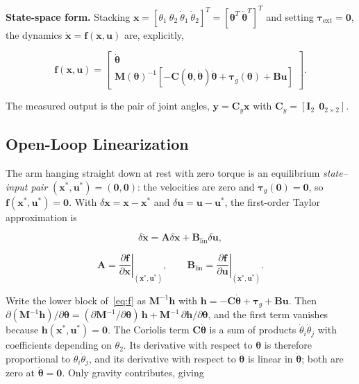 \documentclass[letterpaper, 10pt, conference]{ieeeconf}
\begin{document}
\textbf{State-space form.}
Stacking $\mathbf{x}=[\theta_1\ \theta_2\ \dot{\theta}_1\
\dot{\theta}_2]^{T}=[\boldsymbol{\theta}^T\
\dot{\boldsymbol{\theta}}^T]^T$ and setting
$\boldsymbol{\tau}_{\mathrm{ext}}=\mathbf{0}$, the
dynamics $\dot{\mathbf{x}}=\mathbf{f}(\mathbf{x},\mathbf{u})$
are, explicitly,

\begin{equation}
\mathbf{f}(\mathbf{x},\mathbf{u})=
\begin{bmatrix}
\dot{\boldsymbol{\theta}}\\[2pt]
\mathbf{M}(\boldsymbol{\theta})^{-1}
\left[-\mathbf{C}(\boldsymbol{\theta},\dot{\boldsymbol{\theta}})
\dot{\boldsymbol{\theta}}
+\boldsymbol{\tau}_g(\boldsymbol{\theta})
+\mathbf{B}\mathbf{u}\right]
\end{bmatrix}.
\label{eq:f}
\end{equation}

The measured output is the pair of joint angles,
$\mathbf{y}=\mathbf{C}_y\mathbf{x}$ with
$\mathbf{C}_y=[\mathbf{I}_2\ \ \mathbf{0}_{2\times2}]$.

\subsection{Open-Loop Linearization}

The arm hanging straight down at rest with zero torque
is an equilibrium \emph{state--input pair}
$(\mathbf{x}^*,\mathbf{u}^*)=(\mathbf{0},\mathbf{0})$:
the velocities are zero and
$\boldsymbol{\tau}_g(\mathbf{0})=\mathbf{0}$, so
$\mathbf{f}(\mathbf{x}^*,\mathbf{u}^*)=\mathbf{0}$.
With $\delta\mathbf{x}=\mathbf{x}-\mathbf{x}^*$ and
$\delta\mathbf{u}=\mathbf{u}-\mathbf{u}^*$, the
first-order Taylor approximation is

\begin{equation}
\boxed{
\delta\dot{\mathbf{x}}
=
\mathbf{A}\delta\mathbf{x}
+
\mathbf{B}_{\mathrm{lin}}\delta\mathbf{u},
}
\label{eq:linear_ss}
\end{equation}

\[
\mathbf{A}=\left.\frac{\partial\mathbf{f}}
{\partial\mathbf{x}}\right|_{(\mathbf{x}^*,\mathbf{u}^*)},
\qquad
\mathbf{B}_{\mathrm{lin}}=\left.\frac{\partial\mathbf{f}}
{\partial\mathbf{u}}\right|_{(\mathbf{x}^*,\mathbf{u}^*)}.
\]

Write the lower block of~\eqref{eq:f} as
$\mathbf{M}^{-1}\mathbf{h}$ with
$\mathbf{h}=-\mathbf{C}\dot{\boldsymbol{\theta}}
+\boldsymbol{\tau}_g+\mathbf{B}\mathbf{u}$. Then
$\partial(\mathbf{M}^{-1}\mathbf{h})/\partial\boldsymbol{\theta}
=(\partial\mathbf{M}^{-1}/\partial\boldsymbol{\theta})\,\mathbf{h}
+\mathbf{M}^{-1}\,\partial\mathbf{h}/\partial\boldsymbol{\theta}$,
and the first term vanishes because
$\mathbf{h}(\mathbf{x}^*,\mathbf{u}^*)=\mathbf{0}$.
The Coriolis term $\mathbf{C}\dot{\boldsymbol{\theta}}$
is a sum of products $\dot{\theta}_i\dot{\theta}_j$ with
coefficients depending on $\theta_2$. Its derivative with
respect to $\boldsymbol{\theta}$ is therefore proportional to
$\dot{\theta}_i\dot{\theta}_j$, and its derivative with
respect to $\dot{\boldsymbol{\theta}}$ is linear in
$\dot{\boldsymbol{\theta}}$; both are zero at
$\dot{\boldsymbol{\theta}}=\mathbf{0}$. Only gravity
contributes, giving
\end{document}
